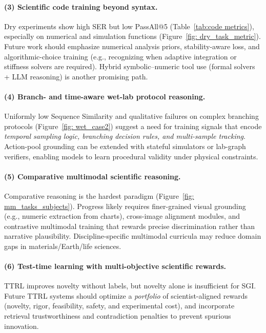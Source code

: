 \paragraph{(3) Scientific code training beyond syntax.}
Dry experiments show high SER but low PassAll@5 (Table~\ref{tab:code metrics}), especially on numerical and simulation functions (Figure~\ref{fig: dry_task_metric}). Future work should emphasize numerical analysis priors, stability-aware loss, and algorithmic-choice training (e.g., recognizing when adaptive integration or stiffness solvers are required). Hybrid symbolic--numeric tool use (formal solvers + LLM reasoning) is another promising path.

\paragraph{(4) Branch- and time-aware wet-lab protocol reasoning.}
Uniformly low Sequence Similarity and qualitative failures on complex branching protocols (Figure~\ref{fig: wet_case2}) suggest a need for training signals that encode \emph{temporal sampling logic, branching decision rules, and multi-sample tracking}. Action-pool grounding can be extended with stateful simulators or lab-graph verifiers, enabling models to learn procedural validity under physical constraints.

\paragraph{(5) Comparative multimodal scientific reasoning.}
Comparative reasoning is the hardest paradigm (Figure~\ref{fig: mm_tasks_subjects}). Progress likely requires finer-grained visual grounding (e.g., numeric extraction from charts), cross-image alignment modules, and contrastive multimodal training that rewards precise discrimination rather than narrative plausibility. Discipline-specific multimodal curricula may reduce domain gaps in materials/Earth/life sciences.

\paragraph{(6) Test-time learning with multi-objective scientific rewards.}
TTRL improves novelty without labels, but novelty alone is insufficient for SGI. Future TTRL systems should optimize a \emph{portfolio} of scientist-aligned rewards (novelty, rigor, feasibility, safety, and experimental cost), and incorporate retrieval trustworthiness and contradiction penalties to prevent spurious innovation.

